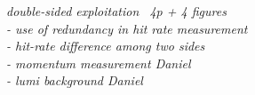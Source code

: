 {\it double-sided exploitation ~4p + 4 figures\\
     - use of redundancy in hit rate measurement\\
     - hit-rate difference among two sides\\
     - momentum measurement  Daniel\\
     - lumi background  Daniel\\
}